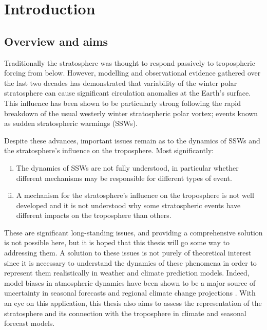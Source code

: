 \chapter{Introduction}
\label{cha:intro}

\section{Overview and aims}

Traditionally the stratosphere was thought to respond passively to tropospheric
forcing from below. However, modelling and observational evidence gathered over
the last two decades has demonstrated that variability of the winter polar
stratosphere can cause significant circulation anomalies at the Earth's
surface. This influence has been shown to be particularly strong following the
rapid breakdown of the usual westerly winter stratospheric polar vortex; events
known as sudden stratospheric warmings (SSWs).

Despite these advances, important issues remain as to the dynamics of SSWs
and the stratosphere's influence on the troposphere. Most significantly:
\begin{enumerate}[i.]
\item The dynamics of SSWs are not fully understood, in particular whether
  different mechanisms may be responsible for different types of event.
\item A mechanism for the stratosphere's influence on the troposphere is not
  well developed and it is not understood why some stratospheric events have
  different impacts on the troposphere than others.
\end{enumerate}
These are significant long-standing issues, and providing a comprehensive
solution is not possible here, but it is hoped that this thesis will go some way
to addressing them. A solution to these issues is not purely of theoretical
interest since it is necessary to understand the dynamics of these phenomena in
order to represent them realistically in weather and climate prediction
models. Indeed, model biases in atmospheric dynamics have been shown to be a
major source of uncertainty in seasonal forecasts \citep{Smith2012} and regional
climate change projections \citep{Shepherd2014}. With an eye on this
application, this thesis also aims to assess the representation of the
stratosphere and its connection with the troposphere in climate and seasonal
forecast models.


